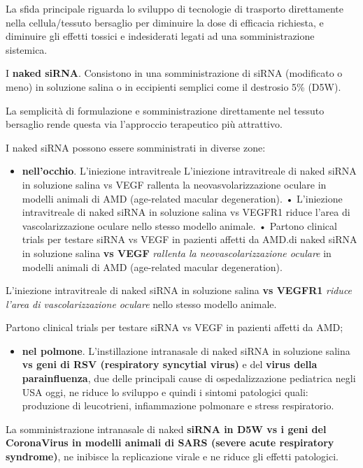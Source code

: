 \documentclass[11pt]{book}
\begin{document}
La sfida principale riguarda lo sviluppo di tecnologie di trasporto
direttamente nella cellula/tessuto bersaglio per diminuire la dose di
efficacia richiesta, e diminuire gli effetti tossici e indesiderati
legati ad una somministrazione sistemica.

I \textbf{naked siRNA}. Consistono in una somministrazione di siRNA
(modificato o meno) in soluzione salina o in eccipienti semplici come il
destrosio 5\% (D5W).

La semplicità di formulazione e somministrazione direttamente nel
tessuto bersaglio rende questa via l'approccio terapeutico più
attrattivo.

I naked siRNA possono essere somministrati in diverse zone:

\begin{itemize}
\itemsep1pt\parskip0pt
\item
  \textbf{nell'occhio}. L'iniezione intravitreale L'iniezione
  intravitreale di naked siRNA in soluzione salina vs VEGF rallenta la
  neovasvolarizzazione oculare in modelli animali di AMD (age-related
  macular degeneration). • L'iniezione intravitreale di naked siRNA in
  soluzione salina vs VEGFR1 riduce l'area di vascolarizzazione oculare
  nello stesso modello animale. • Partono clinical trials per testare
  siRNA vs VEGF in pazienti affetti da AMD.di naked siRNA in soluzione
  salina \textbf{vs VEGF} \emph{rallenta la neovascolarizzazione
  oculare} in modelli animali di AMD (age-related macular degeneration).
\end{itemize}

L'iniezione intravitreale di naked siRNA in soluzione salina \textbf{vs
VEGFR1} \emph{riduce l'area di vascolarizzazione oculare} nello stesso
modello animale.

Partono clinical trials per testare siRNA vs VEGF in pazienti affetti da
AMD;

\begin{itemize}
\itemsep1pt\parskip0pt
\item
  \textbf{nel polmone}. L'instillazione intranasale di naked siRNA in
  soluzione salina \textbf{vs geni di RSV (respiratory syncytial virus)}
  e del \textbf{virus della parainfluenza}, due delle principali cause
  di ospedalizzazione pediatrica negli USA oggi, ne riduce lo sviluppo e
  quindi i sintomi patologici quali: produzione di leucotrieni,
  infiammazione polmonare e stress respiratorio.
\end{itemize}

La somministrazione intranasale di naked \textbf{siRNA in D5W vs i geni
del CoronaVirus in modelli animali di SARS (severe acute respiratory
syndrome)}, ne inibisce la replicazione virale e ne riduce gli effetti
patologici.
\end{document}
